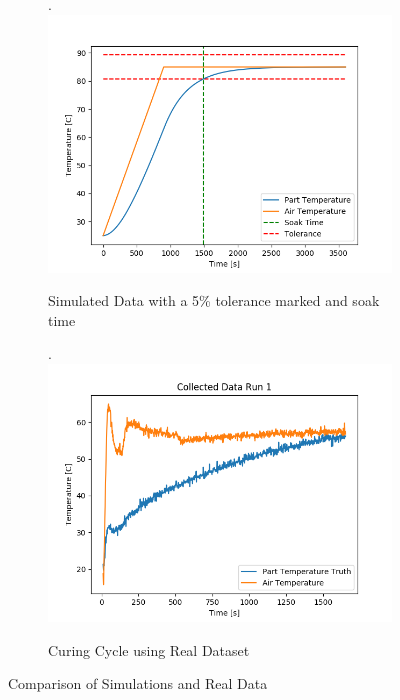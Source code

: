\begin{figure}[!htb]
    \begin{subfigure}{.5\linewidth}.
        \centering
    	\includegraphics[width=0.9\linewidth]{other/sim_data.png}
        \caption{Simulated Data with a 5\% tolerance marked and soak time}
    \end{subfigure}
    \begin{subfigure}{.5\linewidth}.
        \centering
    	\includegraphics[width=0.9\linewidth]{other/Raw_Data/1.png}
        \caption{Curing Cycle using Real Dataset}
    \end{subfigure}
    \caption{Comparison of Simulations and Real Data}
	\label{fig:comparison_sim_real}
\end{figure}
\clearpage

